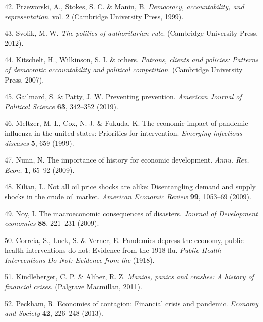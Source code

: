 \documentclass[]{article}
\begin{document}
\begin{cslreferences}
\leavevmode\hypertarget{ref-przeworski1999democracy}{}%
42. Przeworski, A., Stokes, S. C. \& Manin, B. \emph{Democracy, accountability, and representation}. vol. 2 (Cambridge University Press, 1999).

\leavevmode\hypertarget{ref-svolik2012politics}{}%
43. Svolik, M. W. \emph{The politics of authoritarian rule}. (Cambridge University Press, 2012).

\leavevmode\hypertarget{ref-kitschelt2007patrons}{}%
44. Kitschelt, H., Wilkinson, S. I. \& others. \emph{Patrons, clients and policies: Patterns of democratic accountability and political competition}. (Cambridge University Press, 2007).

\leavevmode\hypertarget{ref-gailmard2019preventing}{}%
45. Gailmard, S. \& Patty, J. W. Preventing prevention. \emph{American Journal of Political Science} \textbf{63}, 342--352 (2019).

\leavevmode\hypertarget{ref-meltzer1999economic}{}%
46. Meltzer, M. I., Cox, N. J. \& Fukuda, K. The economic impact of pandemic influenza in the united states: Priorities for intervention. \emph{Emerging infectious diseases} \textbf{5}, 659 (1999).

\leavevmode\hypertarget{ref-nunn2009importance}{}%
47. Nunn, N. The importance of history for economic development. \emph{Annu. Rev. Econ.} \textbf{1}, 65--92 (2009).

\leavevmode\hypertarget{ref-kilian2009not}{}%
48. Kilian, L. Not all oil price shocks are alike: Disentangling demand and supply shocks in the crude oil market. \emph{American Economic Review} \textbf{99}, 1053--69 (2009).

\leavevmode\hypertarget{ref-noy2009macroeconomic}{}%
49. Noy, I. The macroeconomic consequences of disasters. \emph{Journal of Development economics} \textbf{88}, 221--231 (2009).

\leavevmode\hypertarget{ref-correia1918pandemics}{}%
50. Correia, S., Luck, S. \& Verner, E. Pandemics depress the economy, public health interventions do not: Evidence from the 1918 flu. \emph{Public Health Interventions Do Not: Evidence from the} (1918).

\leavevmode\hypertarget{ref-kindleberger2011manias}{}%
51. Kindleberger, C. P. \& Aliber, R. Z. \emph{Manias, panics and crashes: A history of financial crises}. (Palgrave Macmillan, 2011).

\leavevmode\hypertarget{ref-peckham2013economies}{}%
52. Peckham, R. Economies of contagion: Financial crisis and pandemic. \emph{Economy and Society} \textbf{42}, 226--248 (2013).


\end{cslreferences}
\end{document}
